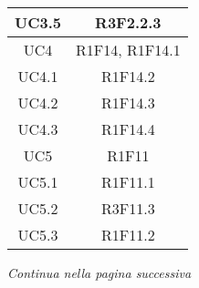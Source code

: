 \begin{table}[H]
\begin{tabular}{c | c}
		UC3.5                                                   & R3F2.2.3       \\ \hline
		UC4                                                     & R1F14, R1F14.1 \\ \hline
		UC4.1                                                   & R1F14.2        \\ \hline
		UC4.2                                                   & R1F14.3        \\ \hline
		UC4.3                                                   & R1F14.4        \\ \hline
		UC5                                                     & R1F11          \\ \hline
		UC5.1                                                   & R1F11.1        \\ \hline
		UC5.2                                                   & R3F11.3        \\ \hline
		UC5.3                                                   & R1F11.2        \\ \hline
	\end{tabular}
\end{table}
\begin{center}
	\textit{\small Continua nella pagina successiva}
\end{center}
